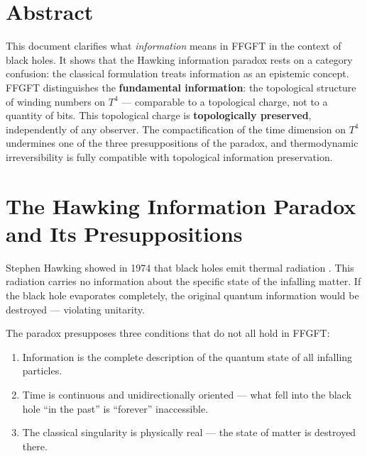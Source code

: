 
\section*{Abstract}

This document clarifies what \emph{information} means in FFGFT in the context of black holes. It shows that the Hawking information paradox rests on a category confusion: the classical formulation treats information as an epistemic concept. FFGFT distinguishes the \textbf{fundamental information}: the topological structure of winding numbers on $T^4$ --- comparable to a topological charge, not to a quantity of bits. This topological charge is \textbf{topologically preserved}, independently of any observer. The compactification of the time dimension on $T^4$ undermines one of the three presuppositions of the paradox, and thermodynamic irreversibility is fully compatible with topological information preservation.

\tableofcontents
\newpage

\section{The Hawking Information Paradox and Its Presuppositions}

Stephen Hawking showed in 1974 that black holes emit thermal radiation \cite{Hawking1974}. This radiation carries no information about the specific state of the infalling matter. If the black hole evaporates completely, the original quantum information would be destroyed --- violating unitarity.

The paradox presupposes three conditions that do not all hold in FFGFT:

\begin{enumerate}
  \item Information is the complete description of the quantum state of all infalling particles.
  \item Time is continuous and unidirectionally oriented --- what fell into the black hole ``in the past'' is ``forever'' inaccessible.
  \item The classical singularity is physically real --- the state of matter is destroyed there.
\end{enumerate}

